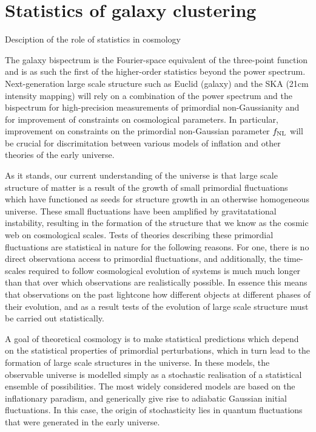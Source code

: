 \chapter{Statistics of galaxy clustering}
\label{chapter:introbisp}

Desciption of the role of statistics in cosmology

The galaxy bispectrum is the Fourier-space equivalent of the three-point function and is as such the first of the higher-order statistics beyond the power spectrum. Next-generation large scale structure such as Euclid (galaxy) and the SKA (21cm intensity mapping) will rely on a combination of the power spectrum and the bispectrum for high-precision measurements of primordial non-Gaussianity and for improvement of constraints on cosmological parameters. In particular, improvement on constraints on the primordial non-Gaussian parameter $f_\text{NL}$ will be crucial for discrimitation between various models of inflation and other theories of the early universe. 

As it stands, our current understanding of the universe is that large scale structure of matter is a result of the growth of small primordial fluctuations which have functioned as seeds for structure growth in an otherwise homogeneous universe. These small fluctuations have been amplified by gravitatational instability, resulting in the formation of the structure that we know as the cosmic web on cosmological scales. Tests of theories describing these primordial fluctuations are statistical in nature for the following reasons. For one, there is no direct observationa access to primordial fluctuations, and additionally, the time-scales required to follow cosmological evolution of systems is much much longer than that over which observations are realistically possible. In essence this means that observations on the past lightcone how different objects at different phases of their evolution, and as a result tests of the evolution of large scale structure must be carried out statistically. 

A goal of theoretical cosmology is to make statistical predictions which depend on the statistical properties of primordial perturbations, which in turn lead to the formation of large scale structures in the universe. In these models, the observable universe is modelled simply as a stochastic realisation of a statistical ensemble of possibilities. The most widely considered models are based on the inflationary paradism, and generically give rise to adiabatic Gaussian initial fluctuations. In this case, the origin of stochasticity lies in quantum fluctuations that were generated in the early universe. 

